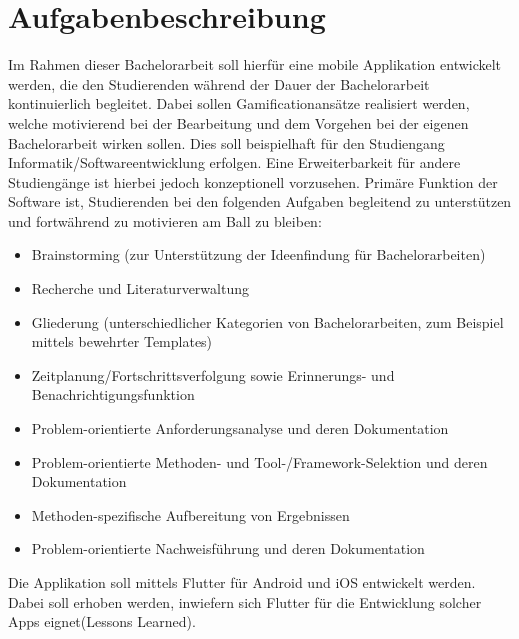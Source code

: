 \documentclass[bibliography=totoc,listof=totoc,BCOR=5mm,DIV=12,oneside]{scrbook}
\begin{document}
\section{Aufgabenbeschreibung}
Im Rahmen dieser Bachelorarbeit soll hierfür eine mobile Applikation entwickelt werden, die den Studierenden während der Dauer der Bachelorarbeit kontinuierlich \grqq begleitet\grqq . Dabei sollen Gamificationansätze realisiert werden, welche motivierend bei der Bearbeitung und dem Vorgehen bei der eigenen Bachelorarbeit wirken sollen. Dies soll beispielhaft für den Studiengang Informatik/Softwareentwicklung erfolgen. Eine Erweiterbarkeit für andere Studiengänge ist hierbei jedoch konzeptionell vorzusehen.
Primäre Funktion der Software ist, Studierenden bei den folgenden Aufgaben begleitend zu unterstützen und fortwährend zu motivieren \grqq am Ball zu bleiben\grqq:
\begin{itemize}
\item Brainstorming (zur Unterstützung der Ideenfindung für Bachelorarbeiten)
\item Recherche und Literaturverwaltung
\item Gliederung (unterschiedlicher Kategorien von Bachelorarbeiten, zum Beispiel mittels bewehrter Templates)
\item Zeitplanung/Fortschrittsverfolgung sowie Erinnerungs- und Benachrichtigungsfunktion 
\item Problem-orientierte Anforderungsanalyse und deren Dokumentation
\item Problem-orientierte Methoden- und Tool-/Framework-Selektion und deren Dokumentation
\item Methoden-spezifische Aufbereitung von Ergebnissen
\item Problem-orientierte Nachweisführung und deren Dokumentation
\end{itemize}
Die Applikation soll mittels Flutter für Android und iOS entwickelt werden. Dabei soll erhoben werden, inwiefern sich Flutter für die Entwicklung solcher Apps eignet(Lessons Learned). 
\end{document}
